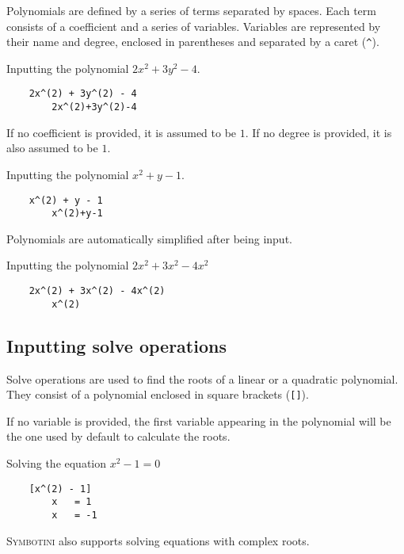 Polynomials are defined by a series of terms separated by spaces. Each term consists of a coefficient and a series of variables. Variables are represented by their name and degree, enclosed in parentheses and separated by a caret (\texttt{\^}).

\begin{exmp}{Inputting the polynomial $2x^2 + 3y^2 - 4$.}
    \begin{verbatim}
    2x^(2) + 3y^(2) - 4
        2x^(2)+3y^(2)-4
    \end{verbatim}
\end{exmp}

If no coefficient is provided, it is assumed to be $1$. If no degree is provided, it is also assumed to be $1$.

\begin{exmp}
    {Inputting the polynomial $x^2 + y - 1$.}
    \begin{verbatim}
    x^(2) + y - 1
        x^(2)+y-1
    \end{verbatim}
\end{exmp}

Polynomials are automatically simplified after being input.

\begin{exmp}
    {Inputting the polynomial $2x^2 + 3x^2 - 4x^2$}
    \begin{verbatim}
    2x^(2) + 3x^(2) - 4x^(2)
        x^(2)
    \end{verbatim}
\end{exmp}

\subsection{Inputting solve operations}

Solve operations are used to find the roots of a linear or a quadratic polynomial. They consist of a polynomial enclosed in square brackets (\verb|[]|).

If no variable is provided, the first variable appearing in the polynomial will be the one used by default to calculate the roots.

\begin{exmp}{Solving the equation $x^2 - 1 = 0$}
    \begin{verbatim}
    [x^(2) - 1]
        x   = 1
        x   = -1
    \end{verbatim}
\end{exmp}

\textsc{Symbotini} also supports solving equations with complex roots.

